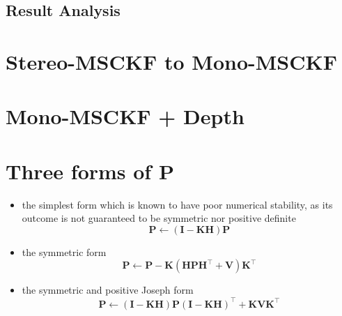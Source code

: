 \documentclass[12pt,a4paper]{article}
\begin{document}
\subsection{Result Analysis}


\section{Stereo-MSCKF to Mono-MSCKF}

\section{Mono-MSCKF + Depth}


\appendix

\section{Three forms of P ~\cite{DBLP:journals/corr/abs-1711-02508}}
\label{appendix:covP}

\begin{itemize}
	\item the simplest form which is known to have poor	numerical stability, as its outcome is not guaranteed to be symmetric nor positive definite
			$$\mathbf{P} \leftarrow(\mathbf{I}-\mathbf{K} \mathbf{H}) \mathbf{P}$$
	\item the symmetric form
			$$\mathbf{P} \leftarrow \mathbf{P}-\mathbf{K}\left(\mathbf{H} \mathbf{P} \mathbf{H}^{\top}+\mathbf{V}\right) \mathbf{K}^{\top}$$
	\item the symmetric and positive Joseph form
			$$\mathbf{P} \leftarrow(\mathbf{I}-\mathbf{K H}) \mathbf{P}(\mathbf{I}-\mathbf{K H})^{\top}+\mathbf{K V K}^{\top}$$
\end{itemize}

\newpage

\end{document}

